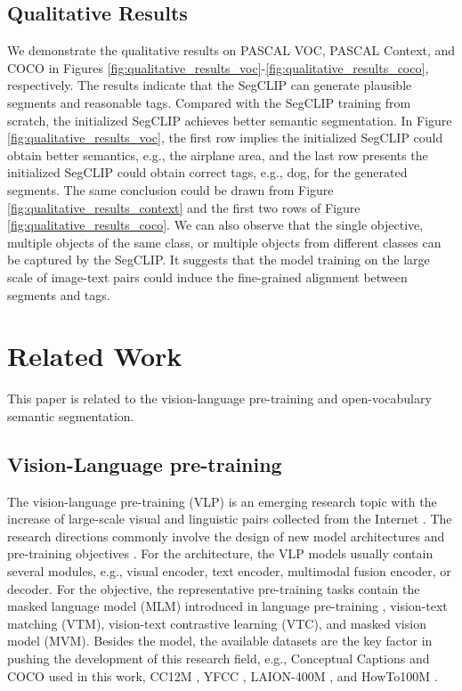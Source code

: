 \documentclass{article}
\theoremstyle{plain}
\theoremstyle{definition}
\theoremstyle{remark}
\begin{document}
\subsection{Qualitative Results}
We demonstrate the qualitative results on PASCAL VOC, PASCAL Context, and COCO in Figures \ref{fig:qualitative_results_voc}-\ref{fig:qualitative_results_coco}, respectively. The results indicate that the SegCLIP can generate plausible segments and reasonable tags. Compared with the SegCLIP training from scratch, the initialized SegCLIP achieves better semantic segmentation. In Figure \ref{fig:qualitative_results_voc}, the first row implies the initialized SegCLIP could obtain better semantics, e.g., the airplane area, and the last row presents the initialized SegCLIP could obtain correct tags, e.g., dog, for the generated segments. The same conclusion could be drawn from Figure \ref{fig:qualitative_results_context} and the first two rows of Figure \ref{fig:qualitative_results_coco}. We can also observe that the single objective, multiple objects of the same class, or multiple objects from different classes can be captured by the SegCLIP. It suggests that the model training on the large scale of image-text pairs could induce the fine-grained alignment between segments and tags.

\section{Related Work}
\label{sec_related_work}
This paper is related to the vision-language pre-training and open-vocabulary semantic segmentation.

\subsection{Vision-Language pre-training}
The vision-language pre-training (VLP) is an emerging research topic with the increase of large-scale visual and linguistic pairs collected from the Internet \cite{tan2019lxmert, Chen2020UNITER, Huang2020PixelBERT, Kim2021ViLT, Li2021UNIMO, Wang2022SimVLM, Sun2019VideoBERT, Luo2020UniVL, Bain2021Frozen, Li2022BLIP, Li2022LAVENDER}.
The research directions commonly involve the design of new model architectures and pre-training objectives \cite{Gan2022VLP}. 
For the architecture, the VLP models usually contain several modules, e.g., visual encoder, text encoder, multimodal fusion encoder, or decoder. 
For the objective, the representative pre-training tasks contain the masked language model (MLM) introduced in language pre-training \cite{Devlin2019BERT}, vision-text matching (VTM),  vision-text contrastive learning (VTC), and masked vision model (MVM). Besides the model, the available datasets are the key factor in pushing the development of this research field, e.g., Conceptual Captions \cite{Sharma2018CC} and COCO \cite{Lin2014COCO} used in this work, CC12M \cite{Changpinyo2021CC12M}, YFCC \cite{Thomee2016YFCC100M}, LAION-400M \cite{Schuhmann2021LAION}, and HowTo100M \cite{Miech2019HowTo100M}.
\end{document}
